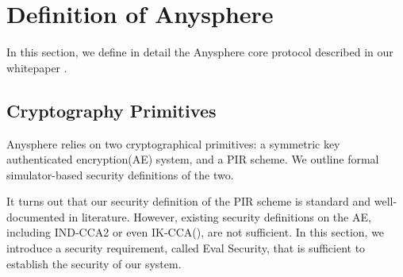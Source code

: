 \section{Definition of Anysphere}
\label{sec:asphr-defn}
In this section, we define in detail the Anysphere core protocol described in our whitepaper \cite{whitepaper}. 
\subsection{Cryptography Primitives}
Anysphere relies on two cryptographical primitives: a symmetric key authenticated encryption(AE) system, and a PIR scheme. We outline formal simulator-based security definitions of the two.

It turns out that our security definition of the PIR scheme is standard and well-documented in literature. However, existing security definitions on the AE, including IND-CCA2 or even IK-CCA(\cite{BBDP01keyprivate}), are not sufficient. In this section, we introduce a security requirement, called Eval Security, that is sufficient to establish the security of our system.
